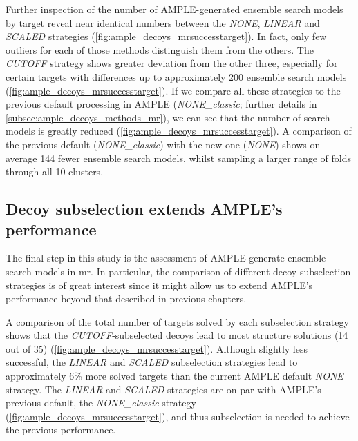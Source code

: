 Further inspection of the number of AMPLE-generated ensemble search models by target reveal near identical numbers between the \textit{NONE}, \textit{LINEAR} and \textit{SCALED} strategies (\cref{fig:ample_decoys_mrsuccesstarget}). In fact, only few outliers for each of those methods distinguish them from the others. The \textit{CUTOFF} strategy shows greater deviation from the other three, especially for certain targets with differences up to approximately 200 ensemble search models (\cref{fig:ample_decoys_mrsuccesstarget}). If we compare all these strategies to the previous default processing in AMPLE (\textit{NONE\_classic}; further details in \cref{subsec:ample_decoys_methods_mr}), we can see that the number of search models is greatly reduced (\cref{fig:ample_decoys_mrsuccesstarget}). A comparison of the previous default (\textit{NONE\_classic}) with the new one (\textit{NONE}) shows on average 144 fewer ensemble search models, whilst sampling a larger range of folds through all 10 clusters.

\subsection{Decoy subselection extends AMPLE's performance}
The final step in this study is the assessment of AMPLE-generate ensemble search models in \gls{mr}. In particular, the comparison of different decoy subselection strategies is of great interest since it might allow us to extend AMPLE's performance beyond that described in previous chapters.

A comparison of the total number of targets solved by each subselection strategy shows that the \textit{CUTOFF}-subselected decoys lead to most structure solutions (14 out of 35) (\cref{fig:ample_decoys_mrsuccesstarget}). Although slightly less successful, the \textit{LINEAR} and \textit{SCALED} subselection strategies lead to approximately 6\% more solved targets than the current AMPLE default \textit{NONE} strategy. The \textit{LINEAR} and \textit{SCALED} strategies are on par with AMPLE's previous default, the \textit{NONE\_classic} strategy (\cref{fig:ample_decoys_mrsuccesstarget}), and thus subselection is needed to achieve the previous performance.

